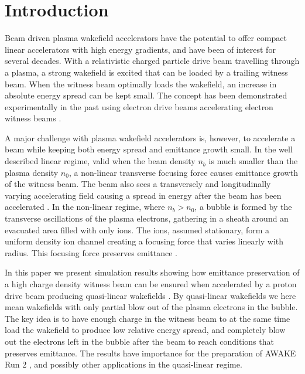 \documentclass[aps,prstab,reprint,amsmath,amssymb,groupedaddress]{revtex4-1}
\begin{document}
\maketitle

\section{Introduction}\label{S:I}

Beam driven plasma wakefield accelerators \cite{chen:1985} have the potential to offer compact linear accelerators with
high energy gradients, and have been of interest for several decades. With a relativistic charged particle drive beam
travelling through a plasma, a strong wakefield is excited that can be loaded by a trailing witness beam. When the
witness beam optimally loads the wakefield, an increase in absolute energy spread can be kept small. The concept has
been demonstrated experimentally in the past using electron drive beams accelerating electron witness beams
\cite{rosenzweig:1988, blumenfeld:2007, kallos:2008, litos:2014}. 

A major challenge with plasma wakefield accelerators is, however, to accelerate a beam while keeping both energy spread
and emittance growth small. In the well described linear regime, valid when the beam density $n_{b}$ is much smaller
than the plasma density $n_{0}$, a non-linear transverse focusing force causes emittance growth of the witness beam.
The beam also sees a transversely and longitudinally varying accelerating field causing a spread in energy after the
beam has been accelerated \cite{katsouleas:1987}. In the non-linear regime, where $n_{b} > n_{0}$, a bubble is formed by
the transverse oscillations of the plasma electrons, gathering in a sheath around an evacuated area filled with only
ions. The ions, assumed stationary, form a uniform density ion channel creating a focusing force that varies linearly
with radius. This focusing force preserves emittance \cite{rosenzweig:1991}.

In this paper we present simulation results showing how emittance preservation of a high charge density witness beam can
be ensured when accelerated by a proton drive beam producing quasi-linear wakefields \cite{rosenzweig:2010}. By
quasi-linear wakefields we here mean wakefields with only partial blow out of the plasma electrons in the bubble.
The key idea is to have enough charge in the witness beam to at the same time load the wakefield to produce low relative
energy spread, and completely blow out the electrons left in the bubble after the beam to reach conditions that
preserves emittance. The results have importance for the preparation of AWAKE Run 2 \cite{adli:2016}, and possibly other
applications in the quasi-linear regime.
\end{document}
